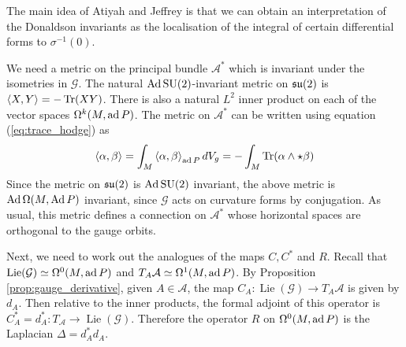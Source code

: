 The main idea of Atiyah and Jeffrey is that we can 
obtain an interpretation of the Donaldson invariants as the
localisation of the integral of certain differential forms to $\sigma^{-1}(0)$.
 

We need a metric on the principal bundle $\mathcal{A}^*$ which is invariant 
under the isometries in $\mathcal{G}$. The natural $\operatorname{Ad} \operatorname{SU}(2)$-invariant metric 
on $\operatorname{\mathfrak{su}}(2)$ is $\gen{X,Y}=-\Tr(XY)$. There is also a natural $L^2$ inner product
on each of the vector spaces  $\Omega^k(M,\operatorname{ad} P)$. The metric on $\mathcal{A}^*$ 
can be written using equation (\ref{eq:trace_hodge}) as
\[
	\gen{\alpha,\beta} = \int_M \gen{\alpha,\beta}_{\ad P} dV_g = -\int_M
	\Tr(\alpha \wedge \star \beta)
\] 
Since the metric on $\operatorname{\mathfrak{su}}(2)$ is  $\operatorname{Ad} \operatorname{SU}(2)$ invariant, the above metric is
$\operatorname{Ad}\Omega(M,\operatorname{Ad} P)$ invariant, since $\mathcal{G}$ acts on curvature forms by
conjugation. As usual, this metric defines a connection on $\mathcal{A}^*$ whose
horizontal spaces are orthogonal to the gauge orbits. 

Next, we need to work out the analogues of the maps $C,C^*$ and $R$. 
Recall that $\operatorname{Lie}(\mathcal{G}) \simeq
\Omega^0(M,\operatorname{ad} P)$ and $T_A \mathcal{A} \simeq \Omega^1(M,\operatorname{ad} P)$. 
By Proposition \ref{prop:gauge_derivative}, given $A \in \mathcal{A}$, the map 
$C_A : \operatorname{Lie}(\mathcal{G}) \to T_A \mathcal{A}$ is given by $d_A$.
Then relative to the inner products, the formal adjoint of this operator is 
$C_A^*=d_A^* : T_\mathcal{A} \to \operatorname{Lie}(\mathcal{G})$. 
Therefore the operator $R$ on $\Omega^0(M,\operatorname{ad} P)$ is the Laplacian
$\Delta=d^*_A d_A$. 


